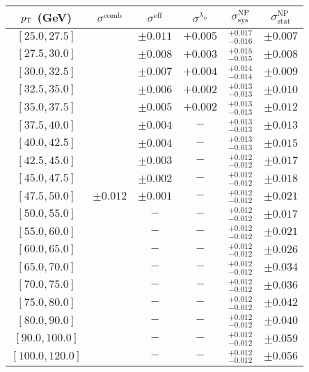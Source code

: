 \begin{tabular}{c||c|c|c||c|c}
$p_\text{T}$ (GeV) & $\sigma^{\text{comb}}$ & $\sigma^{\text{eff}}$ & $\sigma^{\lambda_\phi}$ & $\sigma_{\text{sys}}^{\text{NP}}$ & $\sigma_{\text{stat}}^{\text{NP}}$ \\
\hline
$[25.0, 27.5]$ & \multirow{19}{*}{$\pm0.012$} & $\pm0.011$ & $+0.005$ & $^{+0.017}_{-0.016}$ & $\pm0.007$\\
$[27.5, 30.0]$ &  & $\pm0.008$ & $+0.003$ & $^{+0.015}_{-0.015}$ & $\pm0.008$\\
$[30.0, 32.5]$ &  & $\pm0.007$ & $+0.004$ & $^{+0.014}_{-0.014}$ & $\pm0.009$\\
$[32.5, 35.0]$ &  & $\pm0.006$ & $+0.002$ & $^{+0.013}_{-0.013}$ & $\pm0.010$\\
$[35.0, 37.5]$ &  & $\pm0.005$ & $+0.002$ & $^{+0.013}_{-0.013}$ & $\pm0.012$\\
$[37.5, 40.0]$ &  & $\pm0.004$ & $-$ & $^{+0.013}_{-0.013}$ & $\pm0.013$\\
$[40.0, 42.5]$ &  & $\pm0.004$ & $-$ & $^{+0.013}_{-0.013}$ & $\pm0.015$\\
$[42.5, 45.0]$ &  & $\pm0.003$ & $-$ & $^{+0.012}_{-0.012}$ & $\pm0.017$\\
$[45.0, 47.5]$ &  & $\pm0.002$ & $-$ & $^{+0.012}_{-0.012}$ & $\pm0.018$\\
$[47.5, 50.0]$ &  & $\pm0.001$ & $-$ & $^{+0.012}_{-0.012}$ & $\pm0.021$\\
$[50.0, 55.0]$ &  & $-$ & $-$ & $^{+0.012}_{-0.012}$ & $\pm0.017$\\
$[55.0, 60.0]$ &  & $-$ & $-$ & $^{+0.012}_{-0.012}$ & $\pm0.021$\\
$[60.0, 65.0]$ &  & $-$ & $-$ & $^{+0.012}_{-0.012}$ & $\pm0.026$\\
$[65.0, 70.0]$ &  & $-$ & $-$ & $^{+0.012}_{-0.012}$ & $\pm0.034$\\
$[70.0, 75.0]$ &  & $-$ & $-$ & $^{+0.012}_{-0.012}$ & $\pm0.036$\\
$[75.0, 80.0]$ &  & $-$ & $-$ & $^{+0.012}_{-0.012}$ & $\pm0.042$\\
$[80.0, 90.0]$ &  & $-$ & $-$ & $^{+0.012}_{-0.012}$ & $\pm0.040$\\
$[90.0, 100.0]$ &  & $-$ & $-$ & $^{+0.012}_{-0.012}$ & $\pm0.059$\\
$[100.0, 120.0]$ &  & $-$ & $-$ & $^{+0.012}_{-0.012}$ & $\pm0.056$\\
\end{tabular}
